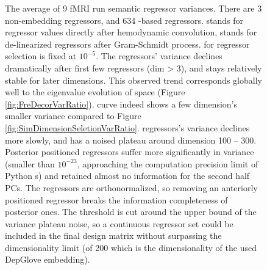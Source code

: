 \begin{figure}
    \centering
    \caption[French  Regressor Variances]{The average of 9 fMRI run semantic regressor variances. There are 3 non-embedding regressors, and 634 -based regressors.  stands for regressor values directly after hemodynamic convolution,  stands for de-linearized regressors after Gram-Schmidt process.  for regressor selection is fixed at \(10^{-5}\). The  regressors' variance declines dramatically after first few  regressors (dim > 3), and stays relatively stable for later dimensions. This observed trend corresponds globally well to the eigenvalue evolution of  space (Figure \ref{fig:FreDecorVarRatio}).  curve indeed shows a few dimension's smaller variance compared to Figure \ref{fig:SimDimensionSeletionVarRatio}.  regressors's variance declines more slowly, and has a noised plateau around dimension 100 -- 300. Posterior positioned regressors suffer more significantly in variance (smaller than \(10^{-23}\), approaching the computation precision limit of Python s) and retained almost no information for the second half PCs. The regressors are orthonormalized, so removing an anteriorly positioned regressor breaks the information completeness of posterior ones. The threshold is cut around the upper bound of the  variance plateau noise, so a continuous regressor set could be included in the final design matrix without surpassing the dimensionality limit (of 200 which is the dimensionality of the used DepGlove embedding).} 
    \label{fig:freSIMRegVar}
\end{figure}


